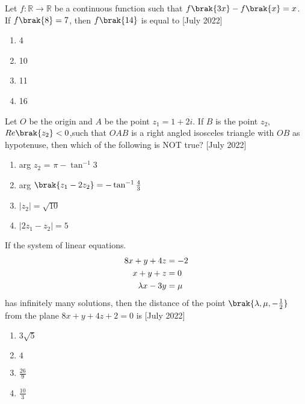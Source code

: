 
\iffalse
  \title{Assignment}
  \author{ai24btech11019}
  \section{mcq-single}
\fi

	\item Let $f: \mathbb{R} \rightarrow \mathbb{R}$ be a continuous function such that $f\brak{3x} - f\brak{x} = x$. If $f\brak{8} = 7$, then $f\brak{14}$ is equal to \hfill{[July 2022]}
    \begin{multicols}{2}
    \begin{enumerate}
        \item 4
        \item 10
        \item 11
        \item 16
    \end{enumerate}
     \end{multicols} 
     \item Let $O$ be the origin and $A$ be the point $z_1 = 1 + 2 i$. If $B$ is the point $z_2$, $Re\brak{z_2} < 0$,such that $OAB$ is a right angled isosceles triangle with $OB$ as hypotenuse, then which of the following is NOT true? \hfill{[July 2022]}
     \begin{multicols}{2}
     \begin{enumerate}
         \item arg $z_2$ = $\pi - \tan^{-1}{3}$
         \item arg $\brak{z_1 - 2 z_2} = -\tan^{-1}\frac{4}{3}$
         \item $|z_2 | = \sqrt{10}$
         \item $|2z_1 - z_2| = 5$
     \end{enumerate}
         
     \end{multicols}
     \item If the system of linear equations.
     \begin{align}
         8x+y+4z &= -2         \notag\\ 
         x+y+z &= 0             \notag\\
         \lambda x-3y &= \mu     \notag
     \end{align}
     has infinitely many solutions, then the distance of the point $\brak{\lambda,\mu,-\frac{1}{2}}$ from the plane $8x +y+4z+2=0$ is \hfill{[July 2022]}
     \begin{multicols}{2}
     \begin{enumerate}
         \item $3\sqrt{5}$
         \item $4$
         \item $\frac{26}{9}$
         \item $\frac{10}{3}$
     \end{enumerate}
        \end{multicols}
